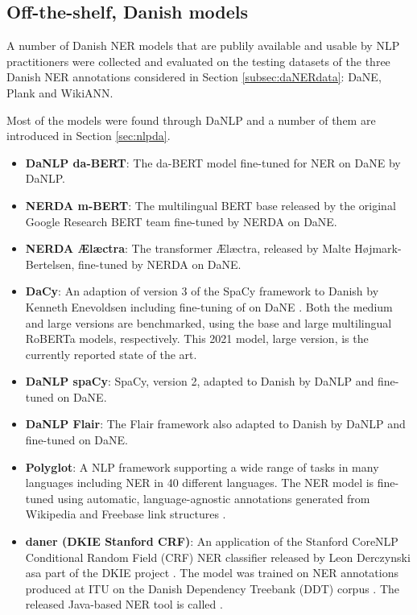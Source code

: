 \documentclass[main.tex]{subfiles}
\begin{document}
\subsection{Off-the-shelf, Danish models}
\label{sec:exidan}
A number of Danish NER models that are publily available and usable by NLP practitioners were collected and evaluated on the testing datasets of the three Danish NER annotations considered in Section \ref{subsec:daNERdata}:
DaNE, Plank and WikiANN.

Most of the models were found through DaNLP \cite{danlp2021} and a number of them are introduced in Section \ref{sec:nlpda}.

\begin{itemize}
    \item \textbf{DaNLP da-BERT}: The da-BERT model \cite{botxo2019dabert} fine-tuned for NER on DaNE by DaNLP.
    \item \textbf{NERDA m-BERT}: The multilingual BERT base released by the original Google Research BERT team \cite{devlin2019bert} fine-tuned by NERDA \cite{kjeldgaard2020nerda} on DaNE.
    \item \textbf{NERDA Ælæctra}: The transformer Ælæctra, released by Malte Højmark-Bertelsen, \cite{bertelsen2020lctra} fine-tuned by NERDA on DaNE.
    \item \textbf{DaCy}: An adaption of version 3 of the SpaCy framework \cite{honnibal2020spacy} to Danish by Kenneth Enevoldsen including fine-tuning of on DaNE \cite{enevoldsen2020dacy}.
        Both the medium and large versions are benchmarked, using the base and large multilingual RoBERTa \cite{conneau2020unsupervised} models, respectively.
        This 2021 model, large version, is the currently reported state of the art.
    \item \textbf{DaNLP spaCy}: SpaCy, version 2, adapted to Danish by DaNLP and fine-tuned on DaNE.
    \item \textbf{DaNLP Flair}: The Flair framework \cite{akbik2019flair} also adapted to Danish by DaNLP and fine-tuned on DaNE.
    \item \textbf{Polyglot}: A NLP framework supporting a wide range of tasks in many languages including NER in 40 different languages.
        The NER model is fine-tuned using automatic, language-agnostic annotations generated from Wikipedia and Freebase link structures \cite{rfou2015polyglot}.
    \item \textbf{daner (DKIE Stanford CRF)}: An application of the Stanford CoreNLP Conditional Random Field (CRF) NER classifier \cite{manning2014corenlp} released by Leon Derczynski asa part of the DKIE project \cite{derc2014dkie}.
    The model was trained on NER annotations produced at ITU on the Danish Dependency Treebank (DDT) corpus \cite{kromann2003ddt}.
    The released Java-based NER tool is called \footnotemark.
\end{itemize}
\end{document}
